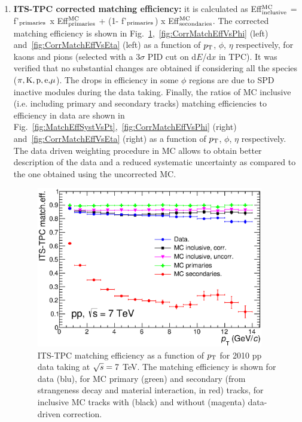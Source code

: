 \begin{enumerate}
\item {\bf ITS-TPC corrected matching efficiency:} it is calculated 
as  Eff$^{\rm MC}_{\rm inclusive}$ = f'$_{\rm primaries}$ x Eff$^{\rm MC}_{\rm primaries}$ + (1- f'$_{\rm primaries}$) x Eff$^{\rm MC}_{\rm secondaries}$. The corrected matching efficiency 
is shown in Fig.~\ref{fig:CorrMatchEffVsPt},~\ref{fig:CorrMatchEffVsPhi} 
(left) and~\ref{fig:CorrMatchEffVsEta} (left)
as a function of $p_{\rm T}$, $\phi$, $\eta$ respectively, for kaons and 
pions (selected with a 3$\sigma$ PID cut on d$E$/d$x$ in TPC). 
It was verified that no substantial changes are obtained if 
considering all the species ($\pi, {\rm K, p, e,} \mu$). 
The drops in efficiency in some $\phi$ regions are due to SPD
inactive modules during the data taking.
Finally, the ratios of MC inclusive (i.e. including primary and secondary tracks) matching efficiencies to
efficiency in data are shown in Fig.~\ref{fig:MatchEffSystVsPt},~\ref{fig:CorrMatchEffVsPhi} 
(right) and~\ref{fig:CorrMatchEffVsEta} (right) as a function of 
$p_{\rm T}$, $\phi$, $\eta$ respectively. The data driven weighting procedure 
in MC allows to obtain better description of the data and a reduced systematic uncertainty
as compared to the one obtained using the uncorrected MC.
\begin{figure}[!htb]
\begin{center}
\includegraphics[height=7cm]{FigCap4/ITSTPCmatchEff_10bpass4_vsPt.eps}
\caption{ITS-TPC matching efficiency as a function of $p_{\rm T}$ for 2010 pp data taking at $\sqrt{s} = 7$ TeV. The matching efficiency is shown for data (blu), for MC primary (green) and secondary (from strangeness decay and material interaction, in red) tracks, for inclusive MC tracks with (black) and without (magenta) data-driven correction. }
\label{fig:CorrMatchEffVsPt}
\end{center}
\end{figure}
\begin{figure}[!htb]

\end{figure}
\end{enumerate}
